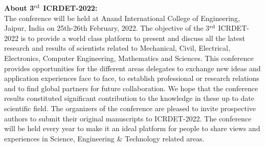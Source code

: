 \documentclass[twoside,11pt]{amsart}
\begin{document}


\newpage
\noindent
{\Large \bf About 3${}^{\rm rd}$ ICRDET-2022: }
\\[7pt]


\noindent
The conference will be held at Anand International College of Engineering, Jaipur, India on 25th-26th February, 2022. The objective of the 3${}^{\rm rd}$ ICRDET-2022 is to provide a world class platform to present and discuss all the latest research and results of scientists related to Mechanical, Civil, Electrical, Electronics, Computer Engineering, Mathematics and Sciences. This conference provides opportunities for the different areas delegates to exchange new ideas and application experiences face to face, to establish professional or research relations and to find global partners for future collaboration. We hope that the conference results constituted significant contribution to the knowledge in these up to date scientific field. The organizers of the conference are pleased to invite prospective authors to submit their original manuscripts to ICRDET-2022. The conference will be held every year to make it an ideal platform for people to share views and experiences in Science, Engineering \& Technology related areas.
\end{document}
